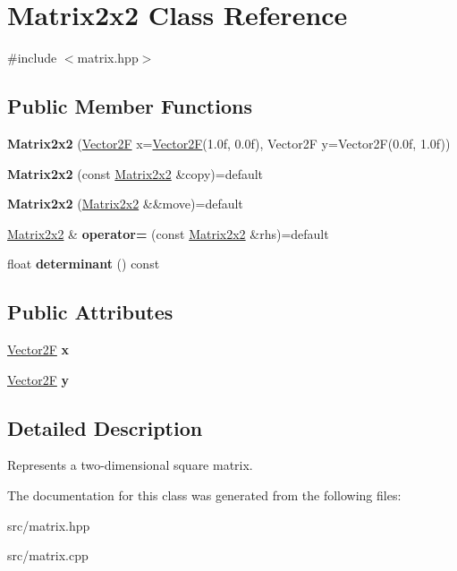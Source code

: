 \hypertarget{class_matrix2x2}{}\section{Matrix2x2 Class Reference}
\label{class_matrix2x2}


{\ttfamily \#include $<$matrix.\+hpp$>$}

\subsection*{Public Member Functions}
\begin{DoxyCompactItemize}
\item 
\mbox{\label{class_matrix2x2_a862d6eb13040d4e06b5cd16de42425bb}} 
{\bfseries Matrix2x2} (\mbox{\hyperlink{class_vector2}{Vector2F}} x=\mbox{\hyperlink{class_vector2}{Vector2F}}(1.\+0f, 0.\+0f), Vector2\+F y=\+Vector2\+F(0.\+0f, 1.\+0f))
\item 
\mbox{\label{class_matrix2x2_ae3aa04e9ea7d5b6ab71f16610f51adb8}} 
{\bfseries Matrix2x2} (const \mbox{\hyperlink{class_matrix2x2}{Matrix2x2}} \&copy)=default
\item 
\mbox{\label{class_matrix2x2_a243b037840998dcc25a81ee9f8573560}} 
{\bfseries Matrix2x2} (\mbox{\hyperlink{class_matrix2x2}{Matrix2x2}} \&\&move)=default
\item 
\mbox{\label{class_matrix2x2_aaecab78b8a1965f02f77cbb4117a074d}} 
\mbox{\hyperlink{class_matrix2x2}{Matrix2x2}} \& {\bfseries operator=} (const \mbox{\hyperlink{class_matrix2x2}{Matrix2x2}} \&rhs)=default
\item 
\mbox{\label{class_matrix2x2_a63d7e0ebd60fdb46fa93f1f89b72e252}} 
float {\bfseries determinant} () const
\end{DoxyCompactItemize}
\subsection*{Public Attributes}
\begin{DoxyCompactItemize}
\item 
\mbox{\label{class_matrix2x2_a1291c8f41a0705641d7adca292c1de97}} 
\mbox{\hyperlink{class_vector2}{Vector2F}} {\bfseries x}
\item 
\mbox{\label{class_matrix2x2_a1b05fb39afd4eec9b1fd590adda089ed}} 
\mbox{\hyperlink{class_vector2}{Vector2F}} {\bfseries y}
\end{DoxyCompactItemize}


\subsection{Detailed Description}
Represents a two-\/dimensional square matrix. 

The documentation for this class was generated from the following files\+:\begin{DoxyCompactItemize}
\item 
src/matrix.\+hpp\item 
src/matrix.\+cpp\end{DoxyCompactItemize}
